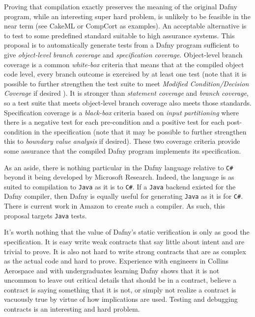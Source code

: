 \documentclass[11pt,onecolumn,notitlepage]{article}
\begin{document}
Proving that compilation exactly preserves the meaning of the original Dafny program, while an interesting super hard problem, is unlikely to be feasible in the near term (see CakeML or CompCort as examples). An acceptable alternative is to test to some predefined standard suitable to high assurance systems. This proposal is to automatically generate tests from a Dafny program sufficient to give \emph{object-level branch coverage} and \emph{specification coverage}. Object-level branch coverage is a common \emph{white-box} criteria that means that at the compiled object code level, every branch outcome is exercised by at least one test (note that it is possible to further strengthen the test suite to meet \emph{Modified Condition/Decision Coverage} if desired \cite{7194601}). It is stronger than \emph{statement coverage} and \emph{branch coverage}, so a test suite that meets object-level branch coverage also meets those standards. Specification coverage is a \emph{black-box} criteria based on \emph{input partitioning} where there is a negative test for each pre-condition and a positive test for each post-condition in the specification (note that it may be possible to further strengthen this to \emph{boundary value analysis} if desired). These two coverage criteria provide some assurance that the compiled Dafny program implements its specification.

As an aside, there is nothing particular in the Dafny language relative to \texttt{C\#} beyond it being developed by Microsoft Research. Indeed, the language is as suited to compilation to \texttt{Java} as it is to \texttt{C\#}. If a \texttt{Java} backend existed for the Dafny compiler, then Dafny is equally useful for generating \texttt{Java} as it is for \texttt{C\#}. There is current work in Amazon to create such a compiler. As such, this proposal targets \texttt{Java} tests.

It's worth nothing that the value of Dafny's static verification is only as good the specification. It is easy write weak contracts that say little about intent and are trivial to prove. It is also not hard to write strong contracts that are as complex as the actual code and hard to prove. Experience with engineers in Collins Aerospace and with undergraduates learning Dafny shows that it is not uncommon to leave out critical details that should be in a contract, believe a contract is saying something that it is not, or simply not realize a contract is vacuously true by virtue of how implications are used. Testing and debugging contracts is an interesting and hard problem. 
\end{document}

